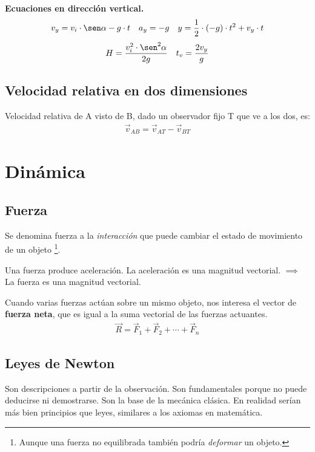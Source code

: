 \documentclass[12pt]{article}
\begin{document}
\textbf{Ecuaciones en dirección vertical.}
\begin{align*}
  v_{y} = v_{i}\cdot \sen \alpha - g\cdot t &  & a_{y} = -g &  & y = \frac{1}{2} \cdot (-g) \cdot t^{2} + v_{y} \cdot t
\end{align*}
\begin{align*}
  H = \frac{v_{i}^{2} \cdot \sen^{2}\alpha}{2g} &  & t_{v} = \frac{2v_{y}}{g}
\end{align*}

\subsection{Velocidad relativa en dos dimensiones}

Velocidad relativa de A visto de B, dado un observador fijo T que ve a los dos,
es:
\begin{align*}
  \vec{v}_{AB} = \vec{v}_{AT} - \vec{v}_{BT}
\end{align*}

\section{Dinámica}

\subsection{Fuerza}

Se denomina fuerza a la \textit{interacción} que puede cambiar el estado de
movimiento de un objeto
\footnote{Aunque una fuerza no equilibrada también podría \textit{deformar}
  un objeto.}.

Una fuerza produce aceleración. La aceleración es una magnitud vectorial.
\(\implies\) La fuerza es una magnitud vectorial.

Cuando varias fuerzas actúan sobre un mismo objeto,
nos interesa el vector de \textbf{fuerza neta},
que es igual a la suma vectorial de las fuerzas actuantes.
\begin{align*}
  \vec{R} = \vec{F}_{1} + \vec{F}_{2} + \cdots + \vec{F}_{n}
\end{align*}

\subsection{Leyes de Newton}

Son descripciones a partir de la observación.
Son fundamentales porque no puede deducirse ni demostrarse.
Son la base de la mecánica clásica.
En realidad serían más bien principios que leyes,
similares a los axiomas en matemática.
\end{document}
